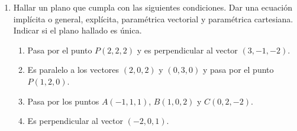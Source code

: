 \documentclass[a4paper]{article}
\newcommand{\exercise}{\item}
\begin{document}
\begin{enumerate}
\begin{enumerate} [label=(\alph*)]
		\item Incluye al punto $P(4,-5,0)$ y es perpendicular al vector $(2,5,-2)$.
		\item Es perpendicular a los vectores $(-2,0,0)$ y $(0,0,-6)$ y pasa por el punto $P(3,3,0)$
		\item Es paralela a $r: (x,y,z)=(2,4,-1)+t(-6,0,2)$ y pasa por $P(4,1,5)$.
		\item Es perpendicular a $r: (x,y,z)=(2,4,-1)+t(-6,0,2)$ y contiene a $P(4,1,5)$.
		\item Pasa por el punto $P(3,3,0)$ y es paralela a la recta $r: \left\{\begin{matrix}y=z\\x=0\end{matrix}\right.$
		\item Es perpendicular a $\pi: x+y+z-3=0$
		\item Es perpendicular a $\pi: 3x-2y+z=5$ y incluye a $P(4,1,5)$
		\item Es paralela a $\pi: 3x-2y+z=5$ y pasa por $P(4,1,5)$
		\item Es perpendicular a $r_1: \displaystyle{\frac{x+2}{2}=-y+3=\frac{z+2}{5}}$ y a $r_2: \displaystyle{x-3=\frac{2y-7}{2}=\frac{z-3}{3}}$ y contiene al punto $P(3,-3,4)$
		\item Pasa por el origen de coordenadas, es perpendicular a $r: (x,y,z)=(1,4,1)+t(3,-5,0)$ y no incluye a $P(0,0,3)$
		\item Está contenida en el plano $\pi: 2x-3y+2z=6$ y es perpendicular a la recta $r: (x,y,z)=(2,-9,7)+t(1,-1,1)$.
		\item Es paralela a los planos $\pi_1: 2x-3y+5z=2$ y $\pi_2: -x+3y+2z=1$ e incluye al punto $P(2,1,0)$.
	\end{enumerate}
	\exercise Hallar un plano que cumpla con las siguientes condiciones. Dar una ecuación implícita o general, explícita, paramétrica vectorial y paramétrica cartesiana. Indicar si el plano hallado es única.
	\begin{enumerate} [label=(\alph*)]
		\item  Pasa por el punto $P(2,2,2)$ y es perpendicular al vector $(3,-1,-2)$.
		\item  Es paralelo a los vectores $(2,0,2)$ y $(0,3,0)$ y pasa por el punto $P(1,2,0)$.
		\item  Pasa por los puntos $A(-1,1,1)$, $B(1,0,2)$ y $C(0,2,-2)$.
		\item  Es perpendicular al vector $(-2,0,1)$.

\end{enumerate}
\end{enumerate}
\end{document}
